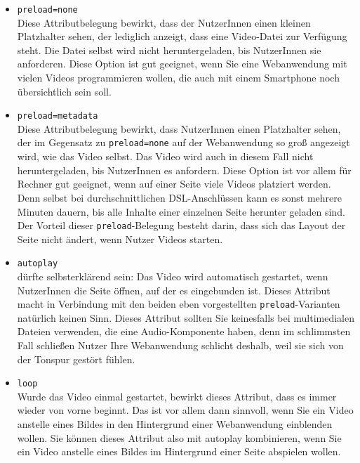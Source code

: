 \begin{itemize}
	\item \verb|preload=none|\\
	
	Diese Attributbelegung bewirkt, dass der NutzerInnen einen kleinen Platzhalter sehen, der lediglich anzeigt, dass eine Video-Datei zur Verfügung steht. Die Datei selbst wird nicht heruntergeladen, bis NutzerInnen sie anforderen. Diese Option ist gut geeignet, wenn Sie eine Webanwendung mit vielen Videos programmieren wollen, die auch mit einem Smartphone noch übersichtlich sein soll.\\
	
	\item \verb|preload=metadata|\\
	
	Diese Attributbelegung bewirkt, dass NutzerInnen einen Platzhalter sehen, der im Gegensatz zu \verb|preload=none| auf der Webanwendung so groß angezeigt wird, wie das Video selbst. Das Video wird auch in diesem Fall nicht heruntergeladen, bis NutzerInnen es anfordern. Diese Option ist vor allem für Rechner gut geeignet, wenn auf einer Seite viele Videos platziert werden. Denn selbst bei durchschnittlichen DSL-Anschlüssen kann es sonst mehrere Minuten dauern, bis alle Inhalte einer einzelnen Seite herunter geladen sind. Der Vorteil dieser \verb|preload|-Belegung besteht darin, dass sich das Layout der Seite nicht ändert, wenn Nutzer Videos starten.\\
	
	\item \verb|autoplay|\\
	
	dürfte selbsterklärend sein: Das Video wird automatisch gestartet, wenn NutzerInnen die Seite öffnen, auf der es eingebunden ist. Dieses Attribut macht in Verbindung mit den beiden eben vorgestellten \verb|preload|-Varianten natürlich keinen Sinn. Dieses Attribut sollten Sie keinesfalls bei multimedialen Dateien verwenden, die eine Audio-Komponente haben, denn im schlimmsten Fall schließen Nutzer Ihre Webanwendung schlicht deshalb, weil sie sich von der Tonspur gestört fühlen.
	
	\item \verb|loop|\\
	
	Wurde das Video einmal gestartet, bewirkt dieses Attribut, dass es immer wieder von vorne beginnt. Das ist vor allem dann sinnvoll, wenn Sie ein Video anstelle eines Bildes in den Hintergrund einer Webanwendung einblenden wollen. Sie können dieses Attribut also mit autoplay kombinieren, wenn Sie ein Video anstelle eines Bildes im Hintergrund einer Seite abspielen wollen.
	

\end{itemize}
